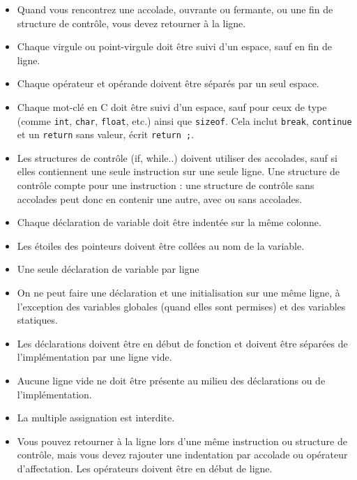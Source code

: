 \documentclass{42-fr}
\begin{document}
\begin{itemize}
                \item Quand vous rencontrez une accolade, ouvrante ou fermante, 
                    ou une fin de structure de contrôle, vous devez retourner à la ligne.

                \item Chaque virgule ou point-virgule doit être suivi d’un espace, sauf en fin de ligne.

                \item Chaque opérateur et opérande doivent être séparés par un seul espace.

                \item Chaque mot-clé en C doit être suivi d’un espace, sauf pour ceux
                    de type (comme \texttt{int}, \texttt{char}, \texttt{float}, etc.) ainsi que \texttt{sizeof}.
                    Cela inclut \texttt{break}, \texttt{continue} et un \texttt{return} sans
                    valeur, écrit \texttt{return ;}.

            \item Les structures de contrôle (if, while..) doivent utiliser des accolades,
                    sauf si elles contiennent une seule instruction sur une seule ligne. Une
                    structure de contrôle compte pour une instruction : une structure de
                    contrôle sans accolades peut donc en contenir une autre, avec ou sans
                    accolades.

                \item Chaque déclaration de variable doit être indentée sur la même colonne.

                \item Les étoiles des pointeurs doivent être collées au nom de la variable.

                \item Une seule déclaration de variable par ligne

                \item On ne peut faire une déclaration et une initialisation sur une même ligne,
                    à l’exception des variables globales (quand elles sont permises) et des variables statiques.

                \item Les déclarations doivent être en début de fonction et doivent être séparées 
                    de l’implémentation par une ligne vide.

                \item Aucune ligne vide ne doit être présente au milieu des déclarations ou de l’implémentation.

                \item La multiple assignation est interdite.

                \item Vous pouvez retourner à la ligne lors d’une même instruction ou structure de
                    contrôle, mais vous devez rajouter une indentation par accolade ou opérateur
                    d’affectation. Les opérateurs doivent être en début de ligne.
            \end{itemize}
\end{document}
